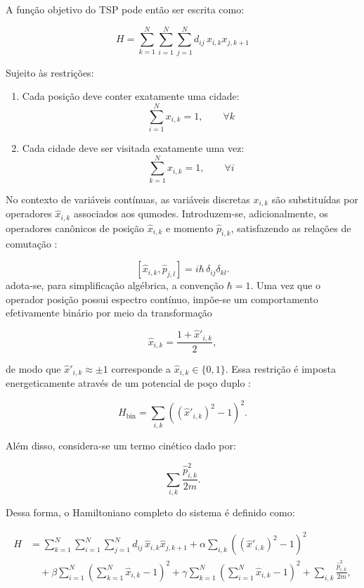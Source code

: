     A função objetivo do TSP pode então ser escrita como:

    $$
        \label{eq:objective_function_hamiltonian}
        H = \sum_{k=1}^N \sum_{i=1}^N \sum_{j=1}^N d_{ij}\, x_{i,k} x_{j,k+1}
    $$

    Sujeito às restrições:

    \begin{enumerate}
        \item Cada posição deve conter exatamente uma cidade:
        $$
            \sum_{i=1}^N x_{i,k} = 1, \qquad \forall k
        $$

        \item Cada cidade deve ser visitada exatamente uma vez:
        $$
            \sum_{k=1}^N x_{i,k} = 1, \qquad \forall i
        $$
    \end{enumerate}

    No contexto de variáveis contínuas, as variáveis discretas $x_{i,k}$ são substituídas por operadores $\hat{x}_{i,k}$ associados aos qumodes. Introduzem-se, adicionalmente, os operadores canônicos de posição $\hat{x}_{i,k}$ e momento $\hat{p}_{i,k}$, satisfazendo as relações de comutação \cite{weedbrook2012gaussian, verdon2019quantum}:

    $$
    [\hat{x}_{i,k}, \hat{p}_{j,l}] = i\hbar\,\delta_{ij}\delta_{kl}.
    $$
    \noindent adota-se, para simplificação algébrica, a convenção $\hbar=1$. Uma vez que o operador posição possui espectro contínuo, impõe-se um comportamento efetivamente binário por meio da transformação \cite{arrazola2019machine}

    $$
    \hat{x}_{i,k} = \frac{1 + \hat{x}'_{i,k}}{2},
    $$

    \noindent de modo que $\hat{x}'_{i,k} \approx \pm 1$ corresponde a $\hat{x}_{i,k} \in \{0,1\}$. Essa restrição é imposta energeticamente através de um potencial de poço duplo \cite{weedbrook2012gaussian}:

    $$
    H_{\text{bin}} = \sum_{i,k} \left( (\hat{x}'_{i,k})^2 - 1 \right)^2.
    $$

    Além disso, considera-se um termo cinético \cite{verdon2019quantum} dado por:

    $$
    \sum_{i,k} \frac{\hat{p}_{i,k}^2}{2m}.
    $$

    Dessa forma, o Hamiltoniano completo do sistema é definido como:

    \begin{equation}
    \begin{aligned}
    H &= \sum_{k=1}^N \sum_{i=1}^N \sum_{j=1}^N d_{ij}\, \hat{x}_{i,k}\hat{x}_{j,k+1}
        + \alpha \sum_{i,k} \left( (\hat{x}'_{i,k})^2 - 1 \right)^2 \\
        &\quad + \beta \sum_{i=1}^N \left(\sum_{k=1}^N \hat{x}_{i,k} - 1 \right)^2
        + \gamma \sum_{k=1}^N \left(\sum_{i=1}^N \hat{x}_{i,k} - 1 \right)^2
        + \sum_{i,k} \frac{\hat{p}_{i,k}^2}{2m},
    \end{aligned}
    \end{equation}

